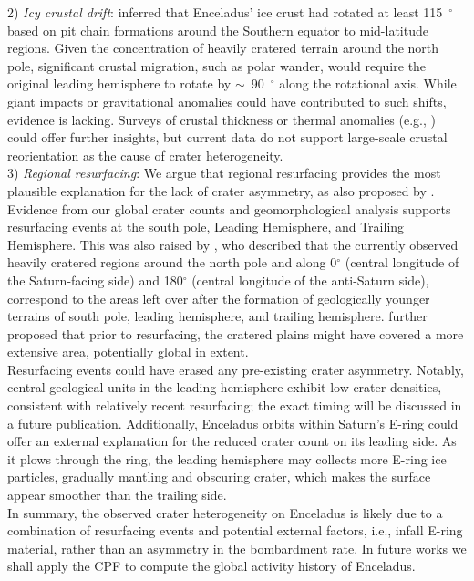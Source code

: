 \documentclass[preprint,11pt,3p,times,authoryear]{elsarticle}
\begin{document}
{2) \textit{Icy crustal drift}: \citet{Martin2014} inferred that Enceladus' ice crust had rotated at least 115~$^\circ$ based on pit chain formations around the Southern equator to mid-latitude regions. Given the concentration of heavily cratered terrain around the north pole, significant crustal migration, such as polar wander, would require the original leading hemisphere to rotate by $\sim$~90~$^\circ$ along the rotational axis. While giant impacts or gravitational anomalies could have contributed to such shifts, evidence is lacking. Surveys of crustal thickness or thermal anomalies (e.g., \citealt{Schenk2024}) could offer further insights, but current data do not support large-scale crustal reorientation as the cause of crater heterogeneity.\\

3) \textit{Regional resurfacing}: We argue that regional resurfacing provides the most plausible explanation for the lack of crater asymmetry, as also proposed by \citet{Zahnle2001}.
Evidence from our global crater counts and geomorphological analysis supports resurfacing events at the south pole, Leading Hemisphere, and Trailing Hemisphere. This was also raised by \citet{Patterson2018}, who described that the currently observed heavily cratered regions around the north pole and along 0$^\circ$ (central longitude of the Saturn-facing side) and 180$^\circ$ (central longitude of the anti-Saturn side), correspond to the areas left over after the formation of geologically younger terrains of south pole, leading hemisphere, and trailing hemisphere. \citet{Patterson2018} further proposed that prior to resurfacing, the cratered plains might have covered a more extensive area, potentially global in extent.\\

Resurfacing events could have erased any pre-existing crater asymmetry. Notably, central geological units in the leading hemisphere exhibit low crater densities, consistent with relatively recent resurfacing; the exact timing will be discussed in a future publication. Additionally, Enceladus orbits within Saturn's E-ring could offer an external explanation for the reduced crater count on its leading side. As it plows through the ring, the leading hemisphere may collects more E-ring ice particles, gradually mantling and obscuring crater, which makes the surface appear smoother than the trailing side.\\

In summary, the observed crater heterogeneity on Enceladus is likely due to a combination of resurfacing events and potential external factors, i.e., infall E-ring material, rather than an asymmetry in the bombardment rate. In future works we shall apply the CPF to compute the global activity history of Enceladus.

}
\end{document}
